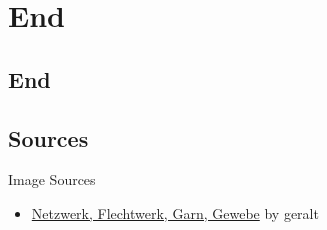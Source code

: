 \section*{End}
\subsection*{End}
\subsection*{Sources}
\begin{frame}{Image Sources}
    \begin{itemize}
        \item \href{https://pixabay.com/de/netzwerk-flechtwerk-garn-gewebe-440738/}{Netzwerk, Flechtwerk, Garn, Gewebe} by geralt
    \end{itemize}
\end{frame}

